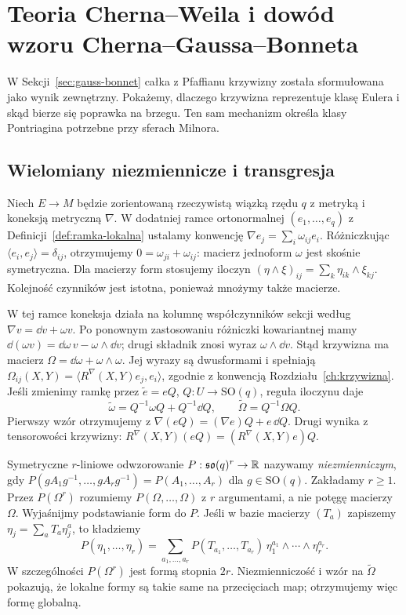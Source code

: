 \chapter{Teoria Cherna--Weila i dowód wzoru Cherna--Gaussa--Bonneta}
\label{ch:chern-weil}

W Sekcji~\ref{sec:gauss-bonnet} całka z Pfaffianu
krzywizny została sformułowana jako wynik
zewnętrzny. Pokażemy, dlaczego krzywizna
reprezentuje klasę Eulera i skąd bierze się
poprawka na brzegu. Ten sam mechanizm określa
klasy Pontriagina potrzebne przy sferach Milnora.

\section{Wielomiany niezmiennicze i transgresja}
\label{sec:chern-weil-26}

Niech $E\to M$ będzie zorientowaną rzeczywistą wiązką rzędu $q$
z metryką i koneksją metryczną $\nabla$.
W dodatniej ramce ortonormalnej $(e_1,\ldots,e_q)$
z Definicji~\ref{def:ramka-lokalna} ustalamy konwencję
$\nabla e_j=\sum_i\omega_{ij}e_i$.
Różniczkując $\langle e_i,e_j\rangle=\delta_{ij}$,
otrzymujemy $0=\omega_{ji}+\omega_{ij}$:
macierz jednoform $\omega$ jest skośnie symetryczna.
Dla macierzy form stosujemy iloczyn
$(\eta\wedge\xi)_{ij}=\sum_k\eta_{ik}\wedge\xi_{kj}$.
Kolejność czynników jest istotna, ponieważ mnożymy także macierze.

W tej ramce koneksja działa na kolumnę współczynników sekcji
według $\nabla v=\dd v+\omega v$.
Po ponownym zastosowaniu różniczki kowariantnej mamy
$\dd(\omega v)=\dd\omega\,v-\omega\wedge\dd v$;
drugi składnik znosi wyraz $\omega\wedge\dd v$.
Stąd krzywizna ma macierz
$\Omega=\dd\omega+\omega\wedge\omega$.
Jej wyrazy są dwusformami i spełniają
$\Omega_{ij}(X,Y)=\langle R^\nabla(X,Y)e_j,e_i\rangle$,
zgodnie z konwencją Rozdziału~\ref{ch:krzywizna}.
Jeśli zmienimy ramkę przez $\widetilde e=eQ$,
$Q:U\to\mathrm{SO}(q)$, reguła iloczynu daje
\[
 \widetilde\omega=Q^{-1}\omega Q+Q^{-1}\dd Q,\qquad
 \widetilde\Omega=Q^{-1}\Omega Q.
\]
Pierwszy wzór otrzymujemy z $\nabla(eQ)=(\nabla e)Q+e\,\dd Q$.
Drugi wynika z tensorowości krzywizny:
$R^\nabla(X,Y)(eQ)=(R^\nabla(X,Y)e)Q$.

\begin{definicja}
\label{def:invariant-polynomial-26}
Symetryczne $r$-liniowe odwzorowanie
$P:\mathfrak{so}(q)^r\to\mathbb{R}$ nazywamy
\emph{niezmienniczym}, gdy
$P(gA_1g^{-1},\ldots,gA_rg^{-1})
=P(A_1,\ldots,A_r)$ dla $g\in\mathrm{SO}(q)$.
Zakładamy $r\geq1$. Przez $P(\Omega^r)$ rozumiemy
$P(\Omega,\ldots,\Omega)$ z $r$ argumentami,
a nie potęgę macierzy $\Omega$.
Wyjaśnijmy podstawianie form do $P$.
Jeśli w bazie macierzy $(T_a)$ zapiszemy
$\eta_j=\sum_a T_a\eta_j^a$, to kładziemy
\[
 P(\eta_1,\ldots,\eta_r)
 =\sum_{a_1,\ldots,a_r}
 P(T_{a_1},\ldots,T_{a_r})\,
 \eta_1^{a_1}\wedge\cdots\wedge\eta_r^{a_r}.
\]
W szczególności $P(\Omega^r)$ jest formą stopnia $2r$.
Niezmienniczość i wzór na $\widetilde\Omega$ pokazują,
że lokalne formy są takie same na przecięciach map;
otrzymujemy więc formę globalną.
\end{definicja}

